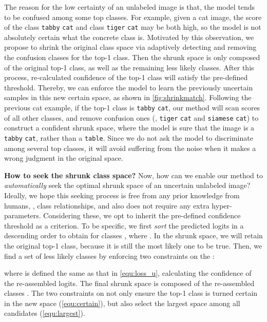 \documentclass[10pt,twocolumn,letterpaper]{article}
\begin{document}
The reason for the low certainty of an unlabeled image is that, the model tends to be confused among some top classes. For example, given a cat image, the score of the class \texttt{tabby} \texttt{cat} and class \texttt{tiger} \texttt{cat} may be both high, so the model is not absolutely certain what the concrete class is. Motivated by this observation, we propose to shrink the original class space via adaptively detecting and removing the confusion classes for the top-1 class. Then the shrunk space is only composed of the original top-1 class, as well as the remaining less likely classes. After this process, re-calculated confidence of the top-1 class will satisfy the pre-defined threshold. Thereby, we can enforce the model to learn the previously uncertain samples in this new certain space, as shown in \cref{fig:shrinkmatch}. Following the previous cat example, if the top-1 class is \texttt{tabby} \texttt{cat}, our method will scan scores of all other classes, and remove confusion ones (\eg, \texttt{tiger} \texttt{cat} and \texttt{siamese} \texttt{cat}) to construct a confident shrunk space, where the model is sure that the image is a \texttt{tabby} \texttt{cat}, rather than a \texttt{table}. Since we do not ask the model to discriminate among several top classes, it will avoid suffering from the noise when it makes a wrong judgment in the original space.

\vspace{1mm}
\noindent
\textbf{How to seek the shrunk class space?}
Now, how can we enable our method to \emph{automatically} seek the optimal shrunk space of an uncertain unlabeled image? Ideally, we hope this seeking process is free from any prior knowledge from humans, \eg, class relationships, and also does not require any extra hyper-parameters. Considering these, we opt to inherit the pre-defined confidence threshold as a criterion. To be specific, we first \emph{sort} the predicted logits in a descending order to obtain  for classes , where . In the shrunk space, we will retain the original top-1 class, because it is still the most likely one to be true. Then, we find a set of less likely classes  by enforcing two constraints on the :

where  is defined the same as that in \cref{equ:loss_u}, calculating the confidence of the re-assembled logits. The final shrunk space is composed of the re-assembled classes . The two constraints on  not only ensure the top-1 class is turned certain in the new space (\cref{equ:certain}), but also select the largest space among all candidates (\cref{equ:largest}).
\end{document}
